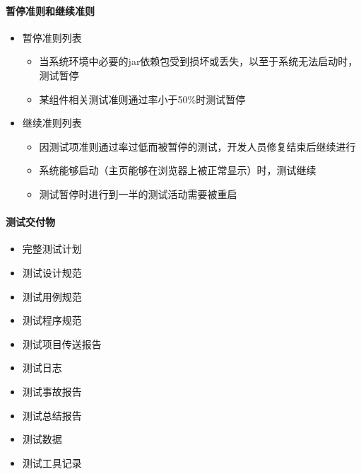 \documentclass[hyperref, a4paper]{ctexart}
\providecommand{\tightlist}{%
  \setlength{\itemsep}{0pt}\setlength{\parskip}{0pt}}
\let\oldparagraph\paragraph
\renewcommand{\paragraph}[1]{\oldparagraph{#1}\mbox{}}
\begin{document}
\hypertarget{ux6682ux505cux51c6ux5219ux548cux7ee7ux7eedux51c6ux5219}{%
\paragraph{暂停准则和继续准则}\label{ux6682ux505cux51c6ux5219ux548cux7ee7ux7eedux51c6ux5219}}

\begin{itemize}
\tightlist
\item
  暂停准则列表

  \begin{itemize}
  \tightlist
  \item
    当系统环境中必要的jar依赖包受到损坏或丢失，以至于系统无法启动时，测试暂停
  \item
    某组件相关测试准则通过率小于50\%时测试暂停
  \end{itemize}
\item
  继续准则列表

  \begin{itemize}
  \tightlist
  \item
    因测试项准则通过率过低而被暂停的测试，开发人员修复结束后继续进行
  \item
    系统能够启动（主页能够在浏览器上被正常显示）时，测试继续
  \item
    测试暂停时进行到一半的测试活动需要被重启
  \end{itemize}
\end{itemize}

\hypertarget{ux6d4bux8bd5ux4ea4ux4ed8ux7269}{%
\paragraph{测试交付物}\label{ux6d4bux8bd5ux4ea4ux4ed8ux7269}}

\begin{itemize}
\tightlist
\item
  完整测试计划
\item
  测试设计规范
\item
  测试用例规范
\item
  测试程序规范
\item
  测试项目传送报告
\item
  测试日志
\item
  测试事故报告
\item
  测试总结报告
\item
  测试数据
\item
  测试工具记录
\end{itemize}
\end{document}
